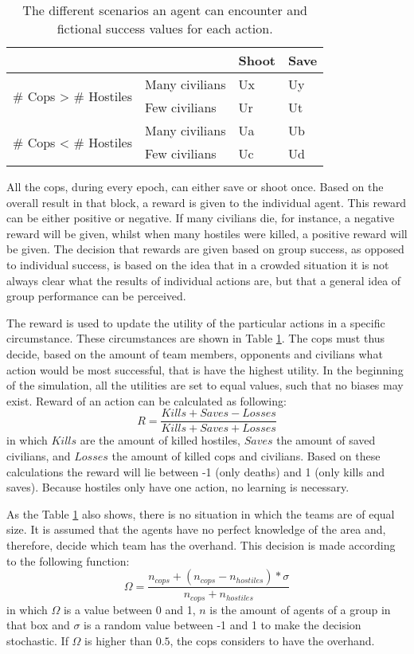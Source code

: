 \begin{table}[!ht]
\begin{center}
\begin{tabular}{l l | l l}
\hline
 & & Shoot & Save \\
\hline
\multirow{2}{*}{\# Cops > \# Hostiles} & Many civilians & Ux & Uy \\
 & Few civilians & Ur & Ut \\
\hline
\multirow{2}{*}{\# Cops < \# Hostiles} & Many civilians & Ua & Ub\\
 & Few civilians & Uc & Ud\\
\hline
\end{tabular}
\caption{The different scenarios an agent can encounter and fictional success values for each action.}
\label{tab:scenarios}
\end{center}
\end{table}
All the cops, during every epoch, can either save or shoot once. Based on the overall result in that block, a reward is given to the individual agent. This reward can be either positive or negative. If many civilians die, for instance, a negative reward will be given, whilst when many hostiles were killed, a positive reward will be given. The decision that rewards are given based on group success, as opposed to individual success, is based on the idea that in a crowded situation it is not always clear what the results of individual actions are, but that a general idea of group performance can be perceived. 

The reward is used to update the utility of the particular actions in a specific circumstance. These circumstances are shown in Table \ref{tab:scenarios}. The cops must thus decide, based on the amount of team members, opponents and civilians what action would be most successful, that is have the highest utility. In the beginning of the simulation, all the utilities are set to equal values, such that no biases may exist. Reward of an action can be calculated as following: 
$$ R = \frac{Kills + Saves - Losses}{Kills + Saves + Losses}$$
in which $Kills$ are the amount of killed hostiles, $Saves$ the amount of saved civilians, and $Losses$ the amount of killed cops and civilians. Based on these calculations the reward will lie between -1 (only deaths) and 1 (only kills and saves). Because hostiles only have one action, no learning is necessary. 

As the Table \ref{tab:scenarios} also shows, there is no situation in which the teams are of equal size. It is assumed that the agents have no perfect knowledge of the area and, therefore, decide which team has the overhand. This decision is made according to the following function:
$$ \Omega = \frac{n_{cops} + (n_{cops}-n_{hostiles})*\sigma}{n_{cops} + n_{hostiles}} $$
in which $\Omega$ is a value between 0 and 1, $n$ is the amount of agents of a group in that box and $\sigma$ is a random value between -1 and 1 to make the decision stochastic. If $\Omega$ is higher than $0.5$, the cops considers to have the overhand.

